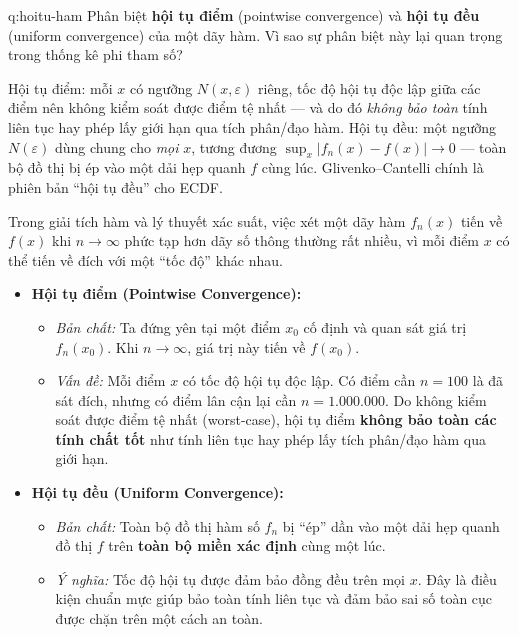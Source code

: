 
\begin{cauhoi}{q:hoitu-ham}
Phân biệt \textbf{hội tụ điểm} (pointwise convergence) và \textbf{hội tụ đều} (uniform convergence) của một dãy hàm. Vì sao sự phân biệt này lại quan trọng trong thống kê phi tham số?
\end{cauhoi}

\begin{chot}
Hội tụ điểm: mỗi $x$ có ngưỡng $N(x,\varepsilon)$ riêng, tốc độ hội tụ độc lập giữa các điểm nên không kiểm soát được điểm tệ nhất --- và do đó \emph{không bảo toàn} tính liên tục hay phép lấy giới hạn qua tích phân/đạo hàm. Hội tụ đều: một ngưỡng $N(\varepsilon)$ dùng chung cho \emph{mọi} $x$, tương đương $\sup_{x}|f_n(x)-f(x)|\to 0$ --- toàn bộ đồ thị bị ép vào một dải hẹp quanh $f$ cùng lúc. Glivenko--Cantelli chính là phiên bản ``hội tụ đều'' cho ECDF.
\end{chot}

Trong giải tích hàm và lý thuyết xác suất, việc xét một dãy hàm $f_n(x)$ tiến về $f(x)$ khi $n\to\infty$ phức tạp hơn dãy số thông thường rất nhiều, vì mỗi điểm $x$ có thể tiến về đích với một ``tốc độ'' khác nhau.
\begin{itemize}
\item \textbf{Hội tụ điểm (Pointwise Convergence):}
  \begin{itemize}
  \item \emph{Bản chất:} Ta đứng yên tại một điểm $x_0$ cố định và quan sát giá trị $f_n(x_0)$. Khi $n\to\infty$, giá trị này tiến về $f(x_0)$.
  \item \emph{Vấn đề:} Mỗi điểm $x$ có tốc độ hội tụ độc lập. Có điểm cần $n=100$ là đã sát đích, nhưng có điểm lân cận lại cần $n=1.000.000$. Do không kiểm soát được điểm tệ nhất (worst-case), hội tụ điểm \textbf{không bảo toàn các tính chất tốt} như tính liên tục hay phép lấy tích phân/đạo hàm qua giới hạn.
  \end{itemize}
\item \textbf{Hội tụ đều (Uniform Convergence):}
  \begin{itemize}
  \item \emph{Bản chất:} Toàn bộ đồ thị hàm số $f_n$ bị ``ép'' dần vào một dải hẹp quanh đồ thị $f$ trên \textbf{toàn bộ miền xác định} cùng một lúc.
  \item \emph{Ý nghĩa:} Tốc độ hội tụ được đảm bảo đồng đều trên mọi $x$. Đây là điều kiện chuẩn mực giúp bảo toàn tính liên tục và đảm bảo sai số toàn cục được chặn trên một cách an toàn.
  \end{itemize}
\end{itemize}

